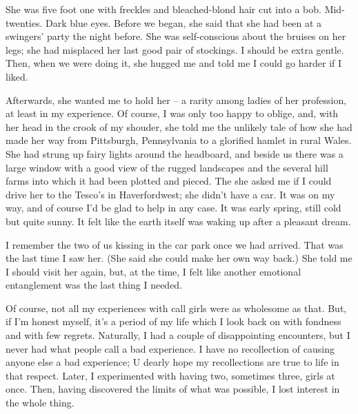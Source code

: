 She was five foot one with freckles and bleached-blond hair cut into a bob. Mid-twenties. Dark blue eyes. Before we began, she said that she had been at a swingers' party the night before. She was self-conscious about the bruises on her legs; she had misplaced her last good pair of stockings. I should be extra gentle. Then, when we were doing it, she hugged me and told me I could go harder if I liked.

Afterwards, she wanted me to hold her -- a rarity among ladies of her profession, at least in my experience. Of course, I was only too happy to oblige, and, with her head in the crook of my shouder, she told me the unlikely tale of how she had made her way from Pittsburgh, Pennsylvania to a glorified hamlet in rural Wales. She had strung up fairy lights around the headboard, and beside us there was a large window with a good view of the rugged landscapes and the several hill farms into which it had been plotted and pieced. The she asked me if I could drive her to the Tesco's in Haverfordwest; she didn't have a car. It was on my way, and of course I'd be glad to help in any case. It was early spring, still cold but quite sunny. It felt like the earth itself was waking up after a pleasant dream.

I remember the two of us kissing in the car park once we had arrived. That was the last time I saw her. (She said she could make her own way back.) She told me I should visit her again, but, at the time, I felt like another emotional entanglement was the last thing I needed.

Of course, not all my experiences with call girls were as wholesome as that. But, if I'm honest myself, it's a period of my life which I look back on with fondness and with few regrets. Naturally, I had a couple of disappointing encounters, but I never had what people call a bad experience. I have no recollection of causing anyone else a bad experience; U dearly hope my recollections are true to life in that respect. Later, I experimented with having two, sometimes three, girls at once. Then, having discovered the limits of what was possible, I lost interest in the whole thing.
